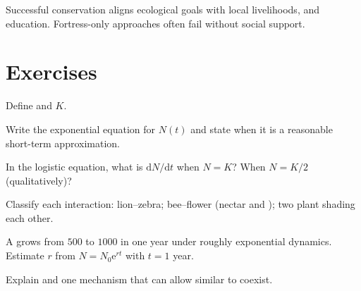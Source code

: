 \begin{remark}
\label{rem:g12:populations-conservation:people}
Successful conservation aligns ecological goals with local livelihoods,
 and education. Fortress-only approaches often fail without social
support.
\end{remark}

\section{Exercises}

\begin{exercise}[$\star$]\label{exo:g12:populations-conservation:1}
Define  and  $K$.
\end{exercise}

\begin{exercise}[$\star$]\label{exo:g12:populations-conservation:2}
Write the exponential  equation for $N(t)$ and state when it is a
reasonable short-term approximation.
\end{exercise}

\begin{exercise}[$\star$]\label{exo:g12:populations-conservation:3}
In the logistic equation, what is $\mathrm{d}N/\mathrm{d}t$ when
$N=K$? When $N=K/2$ (qualitatively)?
\end{exercise}

\begin{exercise}[$\star$]\label{exo:g12:populations-conservation:4}
Classify each interaction: lion--zebra; bee--flower (nectar and
); two plant  shading each other.
\end{exercise}

\begin{exercise}[$\star\star$]\label{exo:g12:populations-conservation:5}
A  grows from $500$ to $1000$ in one year under roughly
exponential dynamics. Estimate $r$ from $N=N_0\mathrm{e}^{rt}$ with
$t = 1$ year.
\end{exercise}

\begin{exercise}[$\star\star$]\label{exo:g12:populations-conservation:6}
Explain  and one mechanism that can allow similar
 to coexist.
\end{exercise}

